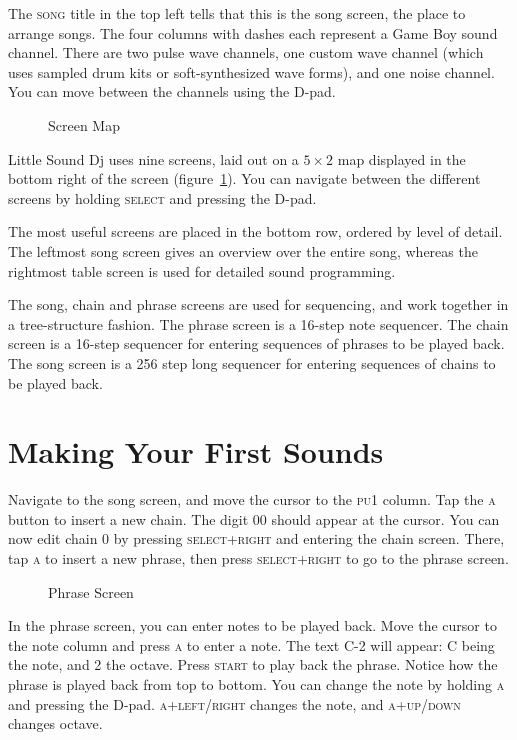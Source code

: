 The \textsc{song} title in the top left tells that this is the song screen,
the place to arrange songs. The four columns with dashes each represent a
Game Boy sound channel. There are two pulse wave channels, one custom wave channel
(which uses sampled drum kits or soft-synthesized wave forms), and one noise channel. You
can move between the channels using the D-pad.

\begin{figure}[hbtp]
\centering
{}
\caption{Screen Map}
\label{fig:map}
\end{figure}

Little Sound Dj uses nine screens, laid out on a \begin{math} 5 \times 2 \end{math} map displayed in the
bottom right of the screen (figure~\ref{fig:map}). You can navigate between the different screens by
holding \textsc{select} and pressing the D-pad.

The most useful screens are placed in the bottom row, ordered by level of detail. The leftmost song screen
gives an overview over the entire song, whereas the rightmost table screen is used for detailed sound programming. 

The song, chain and phrase screens are used for sequencing, and work together in a tree-structure
fashion. The phrase screen is a 16-step note sequencer.
The chain screen is a 16-step sequencer for entering sequences of phrases to
be played back. The song screen is a 256 step long sequencer for entering sequences of
chains to be played back.

\section{Making Your First Sounds}
Navigate to the song screen, and move the cursor to the \textsc{pu1} column. Tap the \textsc{a} button
to insert a new chain. The digit 00 should appear at the cursor. You can now edit chain 0 by pressing \textsc{select+right} and entering the chain screen. There, tap \textsc{a} to insert a new phrase, then press \textsc{select+right} to go to the
phrase screen.

\begin{figure}[hbtp]
\centering
{}
\caption{Phrase Screen}
\label{fig:phrase1}
\end{figure}

In the phrase screen, you can enter notes to be played back. Move the cursor to the note
column and press \textsc{a} to enter a note. The text C-2 will appear: C being the note, and 2 the
octave. Press \textsc{start} to play back the phrase. Notice how the phrase is played back from
top to bottom. You can change the note by holding \textsc{a} and pressing the
D-pad. \textsc{a+left/right} changes the note, and \textsc{a+up/down} changes octave.

